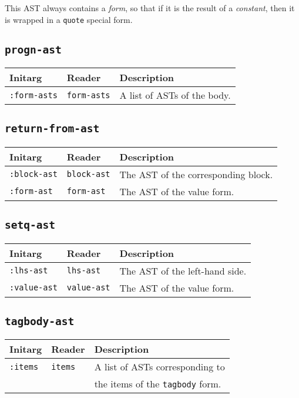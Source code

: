 This AST always contains a \emph{form}, so that if it is the result of
a \emph{constant}, then it is wrapped in a \texttt{quote} special
form. 

\subsection{\texttt{progn-ast}}

\begin{tabular}{|l|l|l|}
\hline
Initarg & Reader & Description\\
\hline\hline
\texttt{:form-asts} & \texttt{form-asts} & A list of ASTs of the body.\\
\hline
\end{tabular}

\subsection{\texttt{return-from-ast}}

\begin{tabular}{|l|l|l|}
\hline
Initarg & Reader & Description\\
\hline\hline
\texttt{:block-ast} & \texttt{block-ast} & The AST of the
corresponding block.\\
\hline
\texttt{:form-ast} & \texttt{form-ast} & The AST of the value form.\\
\hline
\end{tabular}


\subsection{\texttt{setq-ast}}

\begin{tabular}{|l|l|l|}
\hline
Initarg & Reader & Description\\
\hline\hline
\texttt{:lhs-ast} & \texttt{lhs-ast} & The AST of the left-hand side.\\
\hline
\texttt{:value-ast} & \texttt{value-ast} & The AST of the value form.\\
\hline
\end{tabular}


\subsection{\texttt{tagbody-ast}}

\begin{tabular}{|l|l|l|}
\hline
Initarg & Reader & Description\\
\hline\hline
\texttt{:items} & \texttt{items} & A list of ASTs corresponding to\\
& & the items of the \texttt{tagbody} form. \\
\hline
\end{tabular}

